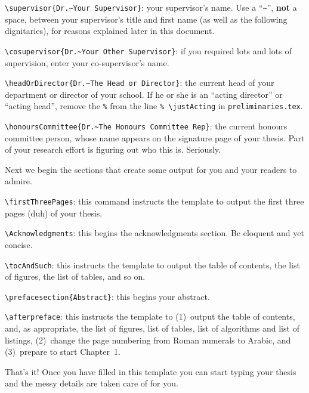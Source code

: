 \smallskip
\noindent\verb|\supervisor{Dr.~Your Supervisor}|: your supervisor's
name.  Use a ``\verb|~|'', \textbf{not} a space, between your
supervisor's title and first name (as well as the following
dignitaries), for reasons explained later in this document.

\smallskip
\noindent\verb|\cosupervisor{Dr.~Your Other Supervisor}|: if you
required lots and lots of supervision, enter your co-supervisor's name.

\smallskip
\noindent\verb|\headOrDirector{Dr.~The Head or Director}|: the current
head of your department or director of your school.  If he or she is
an ``acting director'' or ``acting head'', remove the \verb|%| from
the line \verb|% \justActing| in \verb|preliminaries.tex|.

\smallskip
\noindent\verb|\honoursCommittee{Dr.~The Honours Committee Rep}|:
the current honours committee person, whose name appears on the
signature page of your thesis.  Part of your research effort is
figuring out who this is.  Seriously.

\smallskip
Next we begin the sections that create some output for you and your
readers to admire.

\smallskip
\noindent\verb|\firstThreePages|: this command instructs the template
to output the first three pages (duh) of your thesis.

\smallskip
\noindent\verb|\Acknowledgments|: this begins the acknowledgments
section.  Be eloquent and yet concise.

\smallskip
\noindent\verb|\tocAndSuch|: this instructs the template to output
the table of contents, the list of figures, the list of tables, and so
on.

\smallskip
\noindent\verb|\prefacesection{Abstract}|: this begins your abstract.

\smallskip
\noindent\verb|\afterpreface|: this instructs the template to
(1)~output the table of contents, and, as appropriate, the list of
figures, list of tables, list of algorithms and list of listings,
(2)~change the page numbering from Roman numerals to Arabic, and
(3)~prepare to start Chapter~1.

\smallskip
That's it!  Once you have filled in this template you can start typing
your thesis and the messy details are taken care of for you.
